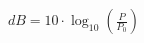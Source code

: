 \documentclass[preview]{standalone}
\begin{document}
\begin{align*}
dB = 10 \cdot \log_{10}\left(\frac{P}{P_0}\right)
\end{align*}
\end{document}
